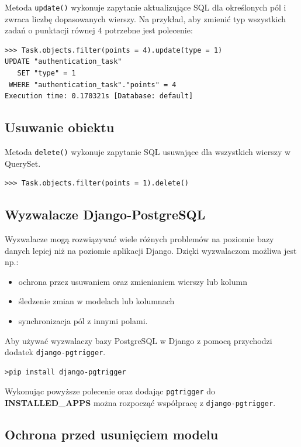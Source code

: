 \documentclass[oneside,polski,logo,indent]{amuthesis}
\begin{document}
Metoda \texttt{update()} wykonuje zapytanie aktualizujące SQL dla określonych pól i zwraca liczbę dopasowanych wierszy. Na przykład, aby zmienić typ wszystkich zadań o punktacji równej $4$ potrzebne jest polecenie:\\

\begin{lstlisting}[style=DOS]
>>> Task.objects.filter(points = 4).update(type = 1)
UPDATE "authentication_task"
   SET "type" = 1
 WHERE "authentication_task"."points" = 4
Execution time: 0.170321s [Database: default]
\end{lstlisting}

\begin{center}
\subsection{Usuwanie obiektu}
\end{center}
Metoda \texttt{delete()} wykonuje zapytanie SQL usuwające dla wszystkich wierszy w QuerySet.
\begin{lstlisting}[style=DOS]
>>> Task.objects.filter(points = 1).delete()
\end{lstlisting}

\begin{center}
\section{Wyzwalacze Django-PostgreSQL}
\end{center}
Wyzwalacze mogą rozwiązywać wiele różnych problemów na poziomie bazy danych lepiej niż na poziomie aplikacji Django. Dzięki wyzwalaczom możliwa jest np.:
\begin{itemize}
\item ochrona przez usuwaniem oraz zmienianiem wierszy lub kolumn
\item śledzenie zmian w modelach lub kolumnach
\item synchronizacja pól z innymi polami.
\end{itemize}
Aby używać wyzwalaczy bazy PostgreSQL w Django z pomocą przychodzi dodatek \texttt{django-pgtrigger}.
\begin{lstlisting}[style=DOS]
>pip install django-pgtrigger
\end{lstlisting}
Wykonując powyższe polecenie oraz dodając \texttt{pgtrigger} do \textbf{INSTALLED\_APPS} można rozpocząć współpracę z \texttt{django-pgtrigger}.
\begin{center}
\subsection{Ochrona przed usunięciem modelu}
\end{center}
\end{document}

